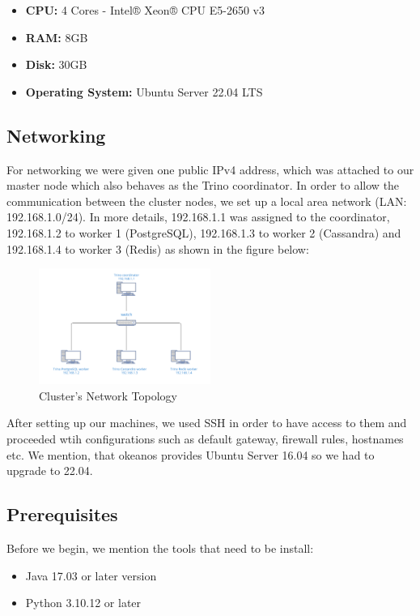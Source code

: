 \documentclass[conference]{IEEEtran}
\begin{document}
\begin{itemize}
	\item \textbf{CPU:} 4 Cores - Intel® Xeon® CPU E5-2650 v3
	\item \textbf{RAM:} 8GB
	\item \textbf{Disk:} 30GB
	\item \textbf{Operating System:} Ubuntu Server 22.04 LTS
\end{itemize}

\subsection{Networking}

For networking we were given one public IPv4 address, which was attached to our master node which also behaves as the Trino coordinator.
In order to allow the communication between the cluster nodes, we set up a local area network (LAN: 192.168.1.0/24). In more details,
192.168.1.1 was assigned to the coordinator, 192.168.1.2 to worker 1 (PostgreSQL), 192.168.1.3 to worker 2 (Cassandra) and 192.168.1.4 to worker 3 (Redis)
as shown in the figure below:

\begin{figure}[h]
	\centering
	\includegraphics[width=0.5\textwidth]{images/LAN.png}
	\caption{Cluster's Network Topology}
	\label{fig:LAN}
\end{figure}

After setting up our machines, we used SSH in order to have access to them and proceeded wtih configurations
such as default gateway, firewall rules, hostnames etc. We mention, that okeanos provides Ubuntu Server 16.04 so
we had to upgrade to 22.04.

\subsection{Prerequisites}

Before we begin, we mention the tools that need to be install:

\begin{itemize}
	\item {Java 17.03 or later version}
	\item {Python 3.10.12 or later}
\end{itemize}
\end{document}
